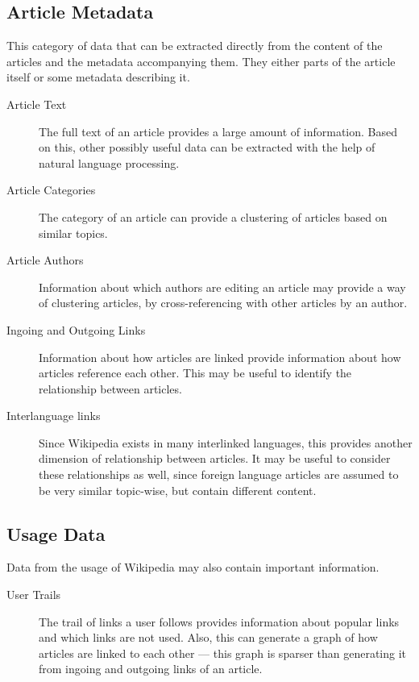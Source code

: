 \subsection{Article Metadata}
This category of data that can be extracted directly from the content of the articles and the metadata accompanying them. They either parts of the article itself or some metadata describing it.
\begin{description}
  \item[Article Text] The full text of an article provides a large amount of information. Based on this, other possibly useful data can be extracted with the help of natural language processing.
  \item[Article Categories] The category of an article can provide a clustering of articles based on similar topics.
  \item[Article Authors] Information about which authors are editing an article may provide a way of clustering articles, by cross-referencing with other articles by an author.
  \item[Ingoing and Outgoing Links] Information about how articles are linked provide information about how articles reference each other. This may be useful to identify the relationship between articles.
  \item[Interlanguage links] Since Wikipedia exists in many interlinked languages, this provides another dimension of relationship between articles. It may be useful to consider these relationships as well, since foreign language articles are assumed to be very similar topic-wise, but contain different content.
\end{description}

\subsection{Usage Data}
Data from the usage of Wikipedia may also contain important information.
\begin{description}
  \item[User Trails] The trail of links a user follows provides information about popular links and which links are not used. Also, this can generate a graph of how articles are linked to each other --- this graph is sparser than generating it from ingoing and outgoing links of an article.
\end{description}

